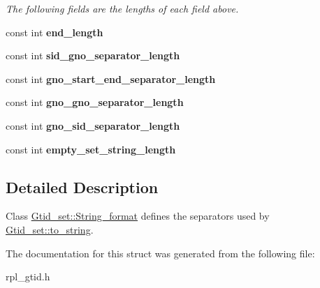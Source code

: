 \begin{DoxyCompactItemize}
\begin{DoxyCompactList}\small\item\em The following fields are the lengths of each field above. \end{DoxyCompactList}\item 
\mbox{\label{structGtid__set_1_1String__format_aeaac08940e44c9f350c1bcee788a4bff}} 
const int {\bfseries end\+\_\+length}
\item 
\mbox{\label{structGtid__set_1_1String__format_a0283525c298a1bc6d5f0fe1593a813f8}} 
const int {\bfseries sid\+\_\+gno\+\_\+separator\+\_\+length}
\item 
\mbox{\label{structGtid__set_1_1String__format_a2edfcb950945b1d7177a8f05bd5500d8}} 
const int {\bfseries gno\+\_\+start\+\_\+end\+\_\+separator\+\_\+length}
\item 
\mbox{\label{structGtid__set_1_1String__format_a873cc394c175f09c7b71dcccb6f735a7}} 
const int {\bfseries gno\+\_\+gno\+\_\+separator\+\_\+length}
\item 
\mbox{\label{structGtid__set_1_1String__format_ae366c1dd9b4a40295188e1f671690b47}} 
const int {\bfseries gno\+\_\+sid\+\_\+separator\+\_\+length}
\item 
\mbox{\label{structGtid__set_1_1String__format_a801f5d1b29c5951133874dad0410d80e}} 
const int {\bfseries empty\+\_\+set\+\_\+string\+\_\+length}
\end{DoxyCompactItemize}


\subsection{Detailed Description}
Class \mbox{\hyperlink{structGtid__set_1_1String__format}{Gtid\+\_\+set\+::\+String\+\_\+format}} defines the separators used by \mbox{\hyperlink{classGtid__set_a256a8c891ab89b5388bdae4df8798d9b}{Gtid\+\_\+set\+::to\+\_\+string}}. 

The documentation for this struct was generated from the following file\+:\begin{DoxyCompactItemize}
\item 
rpl\+\_\+gtid.\+h\end{DoxyCompactItemize}
